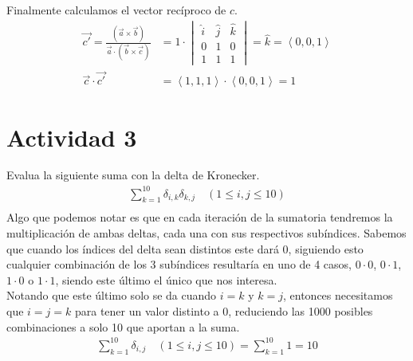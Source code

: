 \documentclass{article}
\newcommand{\custvec}[1]{\left\langle#1\right\rangle}
\begin{document}
Finalmente calculamos el vector recíproco de $c$.
\begin{equation*}
    \begin{split}
        \vec{c'} = \frac{(\vec{a}\times \vec{b})}{\vec{a}\cdot (\vec{b}\times \vec{c})} &= 1\cdot \begin{vmatrix}
        \hat{i} & \hat{j} & \hat{k} \\
        0 & 1 & 0 \\
        1 & 1 & 1
        \end{vmatrix} = \hat{k} = \custvec{0,0,1}\\
        \vec{c}\cdot \vec{c'} &= \custvec{1,1,1}\cdot \custvec{0,0,1} = 1 
    \end{split}
\end{equation*}
\newpage
\section{Actividad 3}
Evalua la siguiente suma con la delta de Kronecker.\\
\begin{equation*}
    \begin{split}
        \sum\limits_{k=1}^{10} \delta_{i,k}\delta_{k,j}\quad(1\leq i,j \leq 10)\\
    \end{split}
\end{equation*}
Algo que podemos notar es que en cada iteración de la sumatoria tendremos la multiplicación de ambas deltas, cada una con sus respectivos subíndices. Sabemos que cuando los índices del delta sean distintos este dará 0, siguiendo esto cualquier combinación de los 3 subíndices resultaría en uno de 4 casos, $0\cdot 0$, $0\cdot 1$, $1\cdot 0$ o $1\cdot1$, siendo este último el único que nos interesa.\\

Notando que este último solo se da cuando $i=k$ y $k=j$, entonces necesitamos que $i=j=k$ para tener un valor distinto a 0, reduciendo las 1000 posibles combinaciones a solo 10 que aportan a la suma.\\
\begin{equation*}
    \begin{split}
        \sum\limits_{k=1}^{10}\delta_{i,j}\quad (1\leq i,j \leq 10) = \sum\limits_{k=1}^{10}1 = 10\\
    \end{split}
\end{equation*}
\newpage
\end{document}
